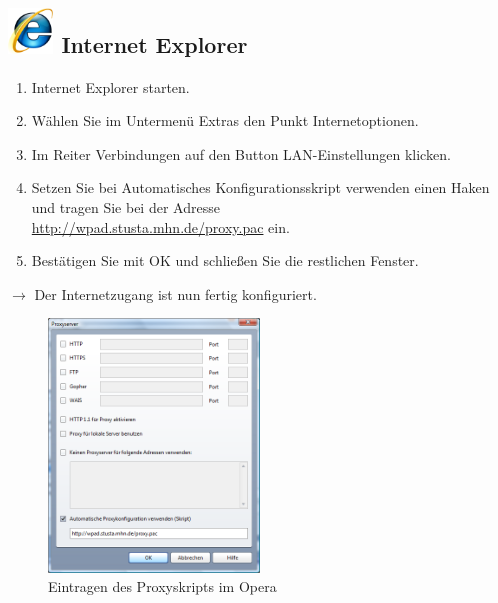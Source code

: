 \documentclass[a4paper,12pt,draft]{scrartcl}
\begin{document}
\subsection*{\includegraphics[height=1.2cm,keepaspectratio]{Bilder/Internet_Explorer_7_Logo} Internet Explorer}
\begin{enumerate}
    \item Internet Explorer starten.
    \item Wählen Sie im Untermenü Extras den Punkt Internetoptionen.
    \item Im Reiter Verbindungen auf den Button LAN-Ein\-stellungen klicken.
    \item Setzen Sie bei Automatisches Konfigurationsskript verwenden einen Haken und tragen Sie bei der Adresse \\ \url{http://wpad.stusta.mhn.de/proxy.pac} ein.
    \item Bestätigen Sie mit OK und schließen Sie die restlichen Fenster.
\end{enumerate}
$\rightarrow$ Der Internetzugang ist nun fertig konfiguriert.

\newpage
\begin{figure}
  \begin{center}
    \includegraphics[width=0.5\textwidth,keepaspectratio]{Bilder/Proxy_Opera}
  \end{center}
  \caption{Eintragen des Proxyskripts im Opera}
\end{figure}
\end{document}
